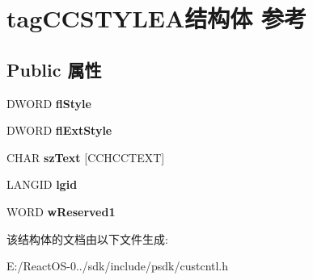 \hypertarget{structtag_c_c_s_t_y_l_e_a}{}\section{tag\+C\+C\+S\+T\+Y\+L\+E\+A结构体 参考}
\label{structtag_c_c_s_t_y_l_e_a}
\subsection*{Public 属性}
\begin{DoxyCompactItemize}
\item 
\mbox{\label{structtag_c_c_s_t_y_l_e_a_ac31183d647470b5400a991d2e69860d1}} 
D\+W\+O\+RD {\bfseries fl\+Style}
\item 
\mbox{\label{structtag_c_c_s_t_y_l_e_a_a87da054fc2251e3240d480bd4f4f0214}} 
D\+W\+O\+RD {\bfseries fl\+Ext\+Style}
\item 
\mbox{\label{structtag_c_c_s_t_y_l_e_a_ad09d70e48b0b6dbd90731c80f0fe742e}} 
C\+H\+AR {\bfseries sz\+Text} \mbox{[}C\+C\+H\+C\+C\+T\+E\+XT\mbox{]}
\item 
\mbox{\label{structtag_c_c_s_t_y_l_e_a_a8afde36861af175b49aaecee426f222a}} 
L\+A\+N\+G\+ID {\bfseries lgid}
\item 
\mbox{\label{structtag_c_c_s_t_y_l_e_a_a3b3934e31f6ce55071e6f3561b421f37}} 
W\+O\+RD {\bfseries w\+Reserved1}
\end{DoxyCompactItemize}


该结构体的文档由以下文件生成\+:\begin{DoxyCompactItemize}
\item 
E\+:/\+React\+O\+S-\/0../sdk/include/psdk/custcntl.\+h\end{DoxyCompactItemize}
